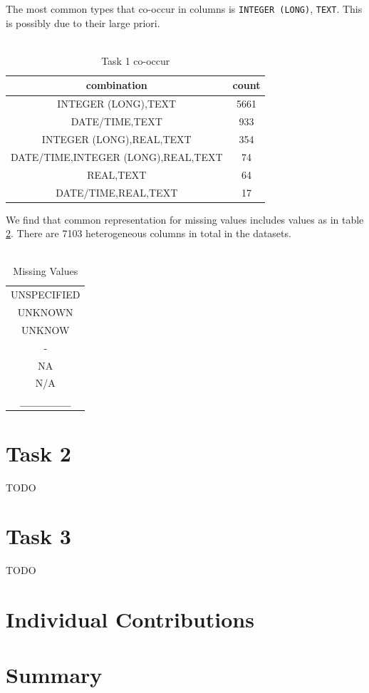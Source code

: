 \documentclass[sigconf]{acmart}
\begin{document}
The most common types that co-occur in columns is \verb|INTEGER (LONG)|, \verb|TEXT|. This is possibly due to their large priori.
\\\\
\begin{table}[h]
    \centering
    \begin{tabular}{ |c|c| }
        \hline
        combination & count \\
        \hline
        INTEGER (LONG),TEXT & 5661 \\
        DATE/TIME,TEXT & 933 \\
        INTEGER (LONG),REAL,TEXT & 354 \\
        DATE/TIME,INTEGER (LONG),REAL,TEXT & 74 \\
        REAL,TEXT & 64 \\
        DATE/TIME,REAL,TEXT & 17 \\
        \hline
    \end{tabular}
    \caption{Task 1 co-occur}
    \label{tk1cooc}
\end{table}
We find that common representation for missing values includes values as in table \ref{msvltb}. There are 7103 heterogeneous columns in total in the datasets.
\\\\
\begin{table}[h]
    \centering
    \begin{tabular}{ |c| }
        \hline
        UNSPECIFIED \\
        UNKNOWN \\
        UNKNOW \\
        - \\
        NA \\
        N/A \\
        \verb|__________| \\
        \hline
    \end{tabular}
    \caption{Missing Values}
    \label{msvltb}
\end{table}

\section{Task 2}

TODO

\section{Task 3}

TODO

\section{Individual Contributions}

\section{Summary}
\end{document}
